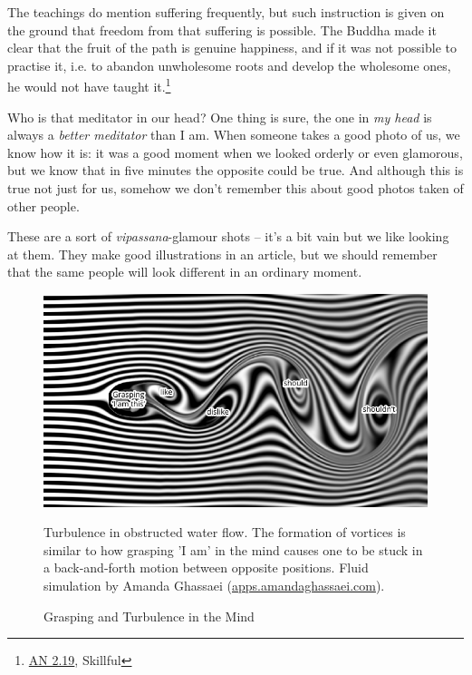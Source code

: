 The teachings do mention suffering frequently, but such instruction is
given on the ground that freedom from that suffering is possible. The
Buddha made it clear that the fruit of the path is genuine happiness,
and if it was not possible to practise it, i.e. to abandon unwholesome
roots and develop the wholesome ones, he would not have taught
it.\footnote{\href{https://suttacentral.net/an2.11-20/en/thanissaro}{AN
  2.19}, Skillful}

Who is that meditator in our head? One thing is sure, the one in
\emph{my head} is always a \emph{better meditator} than I am. When
someone takes a good photo of us, we know how it is: it was a good
moment when we looked orderly or even glamorous, but we know that in
five minutes the opposite could be true. And although this is true not
just for us, somehow we don't remember this about good photos taken of
other people.

These are a sort of \emph{vipassana}-glamour shots -- it's a bit vain
but we like looking at them. They make good illustrations in an article,
but we should remember that the same people will look different in an
ordinary moment.

\vfill

\begin{figure}[h]
\caption{Grasping and Turbulence in the Mind}\label{fig-grasping-turbulence}
\hspace*{-9mm}%
\includegraphics[width=\linewidth+18mm]{./manuscript/tex/diagrams/grasping-turbulence.pdf}

\smallskip

{\footnotesize
Turbulence in obstructed water flow.
The formation of vortices is similar to how grasping 'I am' in the mind
causes one to be stuck in a back-and-forth motion between opposite positions.
Fluid simulation by Amanda Ghassaei (\href{http://apps.amandaghassaei.com/VortexShedding/}{apps.amandaghassaei.com}).
\par}
\end{figure}

